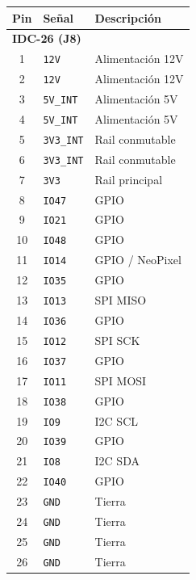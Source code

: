 \documentclass[9pt,a4paper,twocolumn,twoside]{rho-class/rho}
\begin{document}
\newpage%

\begin{table}[H]
\centering
\setlength{\tabcolsep}{4pt}
\begin{tabular}{cll}
\toprule
\textbf{Pin} & \textbf{Señal} & \textbf{Descripción} \\
\midrule

\multicolumn{3}{l}{\textbf{IDC-26 (J8)}} \\
\midrule
1  & \texttt{12V}     & Alimentación 12V \\
2  & \texttt{12V}     & Alimentación 12V \\
3  & \texttt{5V\_INT} & Alimentación 5V \\
4  & \texttt{5V\_INT} & Alimentación 5V \\
5  & \texttt{3V3\_INT} & Rail conmutable \\
6  & \texttt{3V3\_INT} & Rail conmutable \\
7  & \texttt{3V3}      & Rail principal \\
8  & \texttt{IO47}     & GPIO \\
9  & \texttt{IO21}     & GPIO \\
10 & \texttt{IO48}     & GPIO \\
11 & \texttt{IO14}     & GPIO / NeoPixel \\
12 & \texttt{IO35}     & GPIO \\
13 & \texttt{IO13}     & SPI MISO \\
14 & \texttt{IO36}     & GPIO \\
15 & \texttt{IO12}     & SPI SCK \\
16 & \texttt{IO37}     & GPIO \\
17 & \texttt{IO11}     & SPI MOSI \\
18 & \texttt{IO38}     & GPIO \\
19 & \texttt{IO9}      & I2C SCL \\
20 & \texttt{IO39}     & GPIO \\
21 & \texttt{IO8}      & I2C SDA \\
22 & \texttt{IO40}     & GPIO \\
23 & \texttt{GND}      & Tierra \\
24 & \texttt{GND}      & Tierra \\
25 & \texttt{GND}      & Tierra \\
26 & \texttt{GND}      & Tierra \\


\end{tabular}
\end{table}
\end{document}
